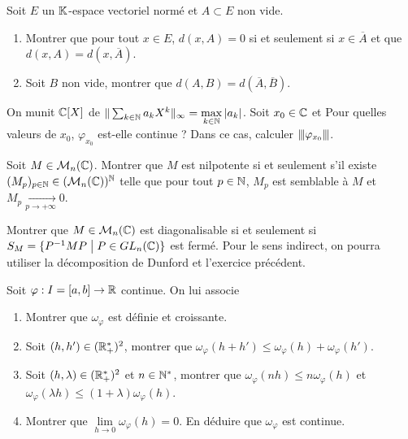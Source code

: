 \begin{exercise}
	Soit $E$ un $\mathbb{K}$-espace vectoriel normé et $A\subset E$ non vide.
	\begin{enumerate}
		\item Montrer que pour tout $x\in E$, $d(x,A)=0$ si et seulement si $x\in\overline{A}$ et que $d(x,A)=d(x,\overline{A})$.
		\item Soit $B$ non vide, montrer que $d(A,B)=d(\overline{A},\overline{B})$.
	\end{enumerate}
\end{exercise}

\begin{exercise}
	On munit $\mathbb{C}[X]$ de $\Vert\sum_{k\in\mathbb{N}}a_{k}X^{k}\Vert_{\infty}=\max\limits_{k\in\mathbb{N}}\vert a_{k}\vert$. Soit $x_{0}\in\mathbb{C}$ et 
	Pour quelles valeurs de $x_{0}$, $\varphi_{x_{0}}$ est-elle continue ? Dans ce cas, calculer ${\left\vert\kern-0.25ex\left\vert\kern-0.25ex\left\vert{}\varphi_{x_{0}} \right\vert\kern-0.25ex\right\vert\kern-0.25ex\right\vert}$.
\end{exercise}

\begin{exercise}
	Soit $M\in\mathcal{M}_{n}(\mathbb{C})$. Montrer que $M$ est nilpotente si et seulement s'il existe $(M_{p})_{p\in\mathbb{N}}\in(\mathcal{M}_{n}(\mathbb{C}))^{\mathbb{N}}$ telle que pour tout $p\in\mathbb{N}$, $M_{p}$ est semblable à $M$ et $M_{p}\xrightarrow[p\to+\infty]{}0$.
\end{exercise}

\begin{exercise}
	Montrer que $M\in\mathcal{M}_{n}(\mathbb{C})$ est diagonalisable si et seulement si $S_{M}=\{P^{-1}MP\bigm| P\in GL_{n}(\mathbb{C})\}$ est fermé. Pour le sens indirect, on pourra utiliser la décomposition de Dunford et l'exercice précédent.
\end{exercise}

\begin{exercise}
	Soit $\varphi:I=[a,b]\to\mathbb{R}$ continue. On lui associe 
	\begin{enumerate}
		\item Montrer que $\omega_{\varphi}$ est définie et croissante.
		\item Soit $(h,h')\in(\mathbb{R}_{+}^{*})^{2}$, montrer que $\omega_{\varphi}(h+h')\leqslant\omega_{\varphi}(h)+\omega_{\varphi}(h')$.
		\item Soit $(h,\lambda)\in(\mathbb{R}_{+}^{*})^{2}$ et $n\in\mathbb{N}^{*}$, montrer que $\omega_{\varphi}(nh)\leqslant n\omega_{\varphi}(h)$ et $\omega_{\varphi}(\lambda h)\leqslant (1+\lambda)\omega_{\varphi}(h)$.
		\item Montrer que $\lim\limits_{h\to 0}\omega_{\varphi}(h)=0$. En déduire que $\omega_{\varphi}$ est continue.
	\end{enumerate}
\end{exercise}

